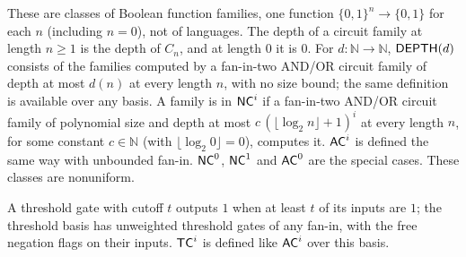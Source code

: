 \begin{definition}
  \label{def:NC-AC}
  \leanok
  These are classes of Boolean function families, one function
  $\{0,1\}^n \to \{0,1\}$ for each $n$ (including $n = 0$), not of languages.
  The depth of a circuit family at length $n \ge 1$ is the depth of $C_n$, and
  at length $0$ it is $0$. For $d : \mathbb{N} \to \mathbb{N}$,
  $\mathsf{DEPTH}(d)$ consists of the families computed by a fan-in-two AND/OR
  circuit family of depth at most $d(n)$ at every length $n$, with no size
  bound; the same definition is available over any basis. A family is in
  $\mathsf{NC}^i$ if a fan-in-two AND/OR circuit family of polynomial size and
  depth at most $c\,(\lfloor \log_2 n \rfloor + 1)^i$ at every length $n$, for
  some constant $c \in \mathbb{N}$ (with $\lfloor \log_2 0 \rfloor = 0$),
  computes it. $\mathsf{AC}^i$ is defined the same way with unbounded fan-in.
  $\mathsf{NC}^0$, $\mathsf{NC}^1$ and $\mathsf{AC}^0$ are the special cases. These classes
  are nonuniform.
\end{definition}

\begin{definition}[$\cc{TC}^i$]
  \label{def:circuits-TC}
  \leanok
  A threshold gate with cutoff $t$ outputs $1$ when at least $t$ of its
  inputs are $1$; the threshold basis has unweighted threshold gates of any
  fan-in, with the free negation flags on their inputs. $\cc{TC}^i$ is defined
  like $\mathsf{AC}^i$ over this basis.
\end{definition}


